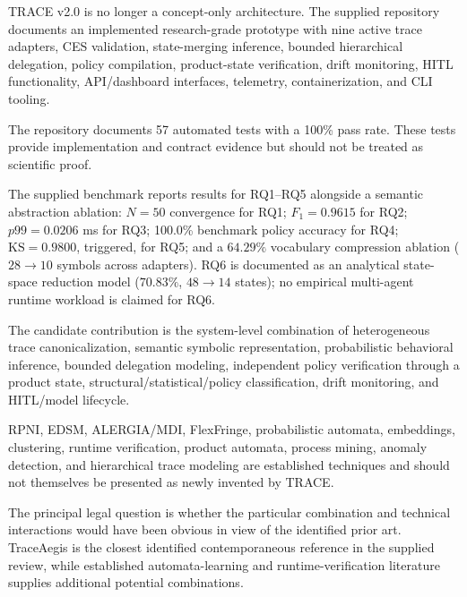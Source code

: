 \documentclass[11pt,a4paper]{article}
\begin{document}
\begin{description}[leftmargin=1.6em, style=nextline]

\item[A. Current implementation status.]
TRACE v2.0 is no longer a concept-only architecture. The supplied repository documents
an implemented research-grade prototype with nine active trace adapters, CES validation,
state-merging inference, bounded hierarchical delegation, policy compilation,
product-state verification, drift monitoring, HITL functionality, API/dashboard
interfaces, telemetry, containerization, and CLI tooling.

\item[B. Software validation.]
The repository documents 57 automated tests with a 100\% pass rate. These tests provide
implementation and contract evidence but should not be treated as scientific proof.

\item[C. Empirical validation.]
The supplied benchmark reports results for RQ1--RQ5 alongside a semantic abstraction ablation:
$N=50$ convergence for RQ1;
$F_1=0.9615$ for RQ2;
$p99=0.0206$ ms for RQ3;
100.0\% benchmark policy accuracy for RQ4;
$\mathrm{KS}=0.9800$, triggered, for RQ5; and
a $64.29\%$ vocabulary compression ablation ($28 \to 10$ symbols across adapters).
RQ6 is documented as an analytical state-space reduction model ($70.83\%$, $48 \to 14$ states);
no empirical multi-agent runtime workload is claimed for RQ6.

\item[D. Candidate technical distinction.]
The candidate contribution is the system-level combination of heterogeneous trace
canonicalization, semantic symbolic representation, probabilistic behavioral inference,
bounded delegation modeling, independent policy verification through a product state,
structural/statistical/policy classification, drift monitoring, and HITL/model lifecycle.

\item[E. Established components.]
RPNI, EDSM, ALERGIA/MDI, FlexFringe, probabilistic automata, embeddings, clustering,
runtime verification, product automata, process mining, anomaly detection, and
hierarchical trace modeling are established techniques and should not themselves be
presented as newly invented by TRACE.

\item[F. Strongest patentability question.]
The principal legal question is whether the particular combination and technical
interactions would have been obvious in view of the identified prior art. TraceAegis is
the closest identified contemporaneous reference in the supplied review, while
established automata-learning and runtime-verification literature supplies additional
potential combinations.


\end{description}
\end{document}
